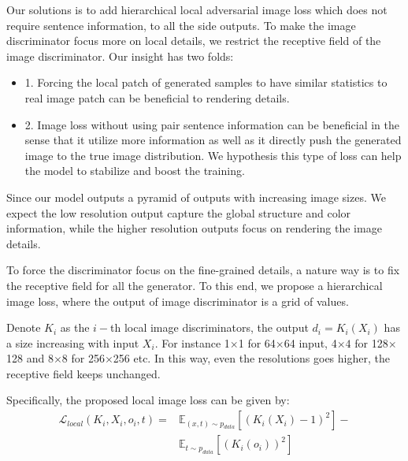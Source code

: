 \documentclass[10pt,twocolumn,letterpaper]{article}
\begin{document}

Our solutions is to add hierarchical local adversarial image loss which does not require sentence information, to all the side outputs. To make the image discriminator focus more on local details, we restrict the receptive field of the image discriminator.
Our insight has two folds:
\begin{itemize}
	\item 1. Forcing the local patch of generated samples to have similar statistics to real image patch can be beneficial to rendering details. %
	 
	\item 2. Image loss without using pair sentence information can be beneficial in the sense that it utilize more information as well as it directly push the generated image to the true image distribution. We hypothesis this type of loss can help the model to stabilize and boost the training. 
\end{itemize}
Since our model outputs a pyramid of outputs with increasing image sizes. 
We expect the low resolution output capture the global structure and color information, while the higher resolution outputs focus on rendering the image details. 

To force the discriminator focus on the fine-grained details, a nature way is to fix the receptive field for all the generator. To this end, we propose a hierarchical image loss, where the output of image  discriminator is a grid of values. 

Denote $K_i$ as the $i-$th local image discriminators,  the output $d_i = K_i(X_i)$ has a size increasing with input $X_i$. For instance 1$\times$1 for 64$\times$64 input, 4$\times 4$ for 128$\times$128 and 8$\times 8$ for 256$\times$256 etc.  In this way, even the resolutions goes higher, the receptive field keeps unchanged. 

Specifically, the proposed local image loss can be given by:
\begin{equation}
\label{equ:local}
\begin{split}
\mathcal{L}_{local}(K_i, X_i, o_i, t )  = & \mathbb{E}_{(x, t) \sim p_{data}}[(K_i( {X_i}) - 1) ^ 2 ] - \\
&  \mathbb{E}_{t \sim p_{data}}[ (K_i( {o}_i))^2 ]  
\end{split}
\end{equation}
\end{document}
